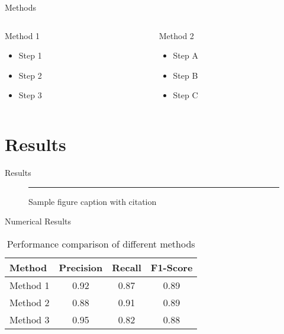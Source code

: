 \documentclass[aspectratio=169]{beamer}
\begin{document}
\begin{frame}{Methods}
  \begin{columns}[T]
    \begin{column}{0.48\textwidth}
      \begin{block}{Method 1}
        \begin{itemize}
          \item Step 1
          \item Step 2
          \item Step 3
        \end{itemize}
      \end{block}
    \end{column}
    \begin{column}{0.48\textwidth}
      \begin{block}{Method 2}
        \begin{itemize}
          \item Step A
          \item Step B
          \item Step C
        \end{itemize}
      \end{block}
    \end{column}
  \end{columns}
\end{frame}

\section{Results}

\begin{frame}{Results}
  \begin{figure}
    \centering
    \rule{0.8\textwidth}{0.6\textheight} %
    \caption{Sample figure caption with citation \cite{Wang2018}}
  \end{figure}
\end{frame}

\begin{frame}{Numerical Results}
  \begin{table}
    \centering
    \begin{tabular}{lccc}
      \hline
      \textbf{Method} & \textbf{Precision} & \textbf{Recall} & \textbf{F1-Score} \\
      \hline
      Method 1 & 0.92 & 0.87 & 0.89 \\
      Method 2 & 0.88 & 0.91 & 0.89 \\
      Method 3 & 0.95 & 0.82 & 0.88 \\
      \hline
    \end{tabular}
    \caption{Performance comparison of different methods \cite{Chen2022}}
  \end{table}
\end{frame}
\end{document}
